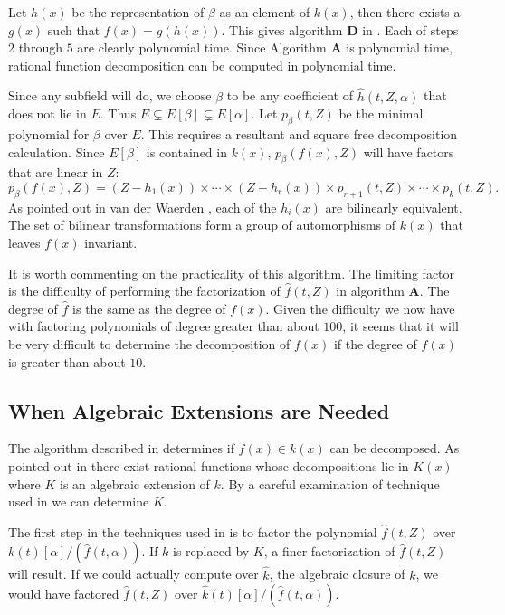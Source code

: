 Let $h(x)$ be the representation of $\beta$ as an element of $k(x)$,
then there exists a $g(x)$ such that $f(x) = g(h(x))$.  This gives
algorithm {\bf D} in .  Each of steps $2$ through $5$
are clearly polynomial time.  Since Algorithm {\bf A} is polynomial
time, rational function decomposition can be computed in polynomial
time.

Since any subfield will do, we choose $\beta$ to be any coefficient of
$\hat{h}(t, Z, \alpha)$ that does not lie in $E$.  Thus $E
\varsubsetneq E[\beta] \varsubsetneq E[\alpha]$.  Let $p_{\beta}(t, Z)$
be the minimal polynomial for $\beta$ over $E$.  This requires a
resultant and square free decomposition calculation.  Since $E[\beta]$
is contained in $k(x)$, $p_{\beta}(f(x), Z)$ will have factors that are
linear in $Z$:
\[
p_{\beta}(f(x), Z) = (Z - h_1(x)) \times \cdots \times (Z - h_r(x)) \times 
  p_{r+1}(t, Z) \times \cdots \times p_{k}(t, Z).
\]
As pointed out in van der Waerden \cite{Van_der_Waerden1964-sy}, each of
the $h_i(x)$ are bilinearly equivalent.  The set of bilinear
transformations form a group of automorphisms of $k(x)$ that leaves
$f(x)$ invariant.

\medskip
It is worth commenting on the practicality of this algorithm.  The
limiting factor is the difficulty of performing the factorization of
$\hat{f}(t, Z)$ in algorithm {\bf A}.  The degree of $\hat{f}$ is the
same as the degree of $f(x)$.  Given the difficulty we now have with
factoring polynomials of degree greater than about $100$, it seems
that it will be very difficult to determine the decomposition of
$f(x)$ if the degree of $f(x)$ is greater than about $10$.


\subsection{When Algebraic Extensions are Needed}
\label{AE:Needed:Sec}

The algorithm described in  determines if $f(x)
\in k(x)$ can be decomposed.  As pointed out in
 there exist rational functions whose
decompositions lie in $K(x)$ where $K$ is an algebraic extension of
$k$.  By a careful examination of technique used in
 we can determine $K$.

The first step in the techniques used in  is to
factor the polynomial $\hat{f}(t, Z)$ over $k(t)[\alpha]/(\hat{f}(t,
\alpha))$.  If $k$ is replaced by $K$, a finer factorization of
$\hat{f}(t, Z)$ will result.  If we could actually compute over
$\hat{k}$, the algebraic closure of $k$, we would have factored
$\hat{f}(t, Z)$ over $\hat{k}(t)[\alpha]/(\hat{f}(t, \alpha))$.  

